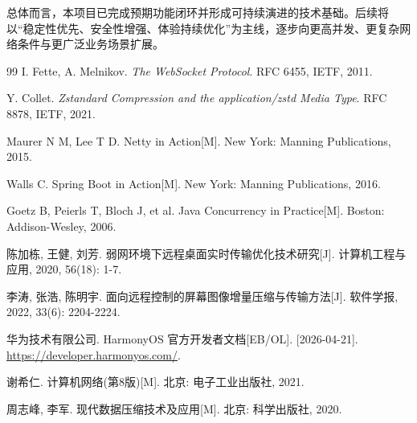 \documentclass[UTF8,fontset=none]{ctexart}
\begin{document}
总体而言，本项目已完成预期功能闭环并形成可持续演进的技术基础。后续将以“稳定性优先、安全性增强、体验持续优化”为主线，逐步向更高并发、更复杂网络条件与更广泛业务场景扩展。

\begingroup\sloppy
\begin{thebibliography}{99}
I. Fette, A. Melnikov. \textit{The WebSocket Protocol}. RFC 6455, IETF, 2011.

Y. Collet. \textit{Zstandard Compression and the application/zstd Media Type}. RFC 8878, IETF, 2021.

Maurer N M, Lee T D. Netty in Action[M]. New York: Manning Publications, 2015.

Walls C. Spring Boot in Action[M]. New York: Manning Publications, 2016.

Goetz B, Peierls T, Bloch J, et al. Java Concurrency in Practice[M]. Boston: Addison-Wesley, 2006.

陈加栋, 王健, 刘芳. 弱网环境下远程桌面实时传输优化技术研究[J]. 计算机工程与应用, 2020, 56(18): 1-7.

李涛, 张浩, 陈明宇. 面向远程控制的屏幕图像增量压缩与传输方法[J]. 软件学报, 2022, 33(6): 2204-2224.

华为技术有限公司. HarmonyOS 官方开发者文档[EB/OL]. [2026-04-21]. \url{https://developer.harmonyos.com/}.

谢希仁. 计算机网络(第8版)[M]. 北京: 电子工业出版社, 2021.

周志峰, 李军. 现代数据压缩技术及应用[M]. 北京: 科学出版社, 2020.
\end{thebibliography}
\endgroup
\end{document}
